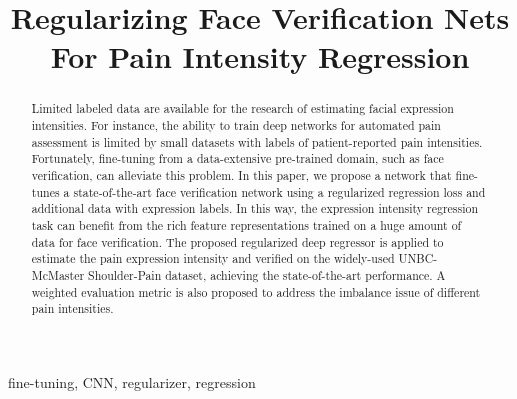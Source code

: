 \documentclass{article}
\begin{document}
\sloppy

\def\x{{\mathbf x}}
\def\L{{\cal L}}


\title{Regularizing Face Verification Nets For Pain Intensity Regression}

\address{
{Dept. of \{$^1$ Computer Science, $^2$ Electrical \& Computer Engineering, $^3$Radiation Oncology\}}\\
{Johns Hopkins University, 3400 N. Charles St, Baltimore, MD 21218, USA}\\
{$^4$ Dept. of EE, UESTC, 2006 Xiyuan Ave, Chengdu, Sichuan 611731, China}\\
{$^5$ Dept. of CS, Tsinghua University, Beijing 100084, China}
}

\maketitle

%
\begin{abstract}
Limited labeled data are available for the research of estimating facial expression intensities. 
For instance, the ability to train deep networks for automated pain assessment is limited by small datasets with labels of patient-reported pain intensities.
Fortunately, fine-tuning from a data-extensive pre-trained domain, such as face verification, can alleviate this problem. 
In this paper, we propose a network that fine-tunes a state-of-the-art face verification network using a regularized regression loss and additional data with expression labels. 
In this way, the expression intensity regression task can benefit from the rich feature representations trained on a huge amount of data for face verification.
The proposed regularized deep regressor is applied to estimate the pain expression intensity and verified on the widely-used UNBC-McMaster Shoulder-Pain dataset, achieving the state-of-the-art performance.
A weighted evaluation metric is also proposed to address the imbalance issue of different pain intensities.
\end{abstract}
%
\begin{keywords}
fine-tuning, CNN, regularizer, regression
\end{keywords}
%
\end{document}
